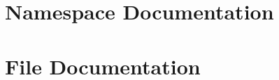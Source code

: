 \documentclass[twoside]{book}
\newcommand{\+}{\discretionary{\mbox{\scriptsize$\hookleftarrow$}}{}{}}
\newcommand{\clearemptydoublepage}{%
  \newpage{\pagestyle{empty}\cleardoublepage}%
}
\begin{document}
\chapter{Namespace Documentation}












\chapter{File Documentation}

























\backmatter
\newpage
{}
\clearemptydoublepage
{}
\printindex
\end{document}
